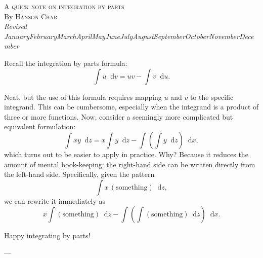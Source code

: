 \documentclass[10pt]{article}
\newcommand{\dd}{\mathop{}\!\mathrm{d}}
\renewcommand{\today}{%
  \number\day\space
  \ifcase\month\or
  January\or February\or March\or April\or May\or June\or July\or August\or September\or October\or November\or December
  \fi
  \space\number\year
}
\begin{document}
\begin{center}
  {\large\textsc{A quick note on integration by parts}}\\[4pt]
  By \textsc{Hanson Char}\\
  {\small\textit{Revised \today}}
\end{center}

Recall the integration by parts formula:
\[
\int u \dd v = uv - \int v \dd u.
\]

Neat, but the use of this formula requires mapping \(u\) and \(v\) to the specific integrand. This can be cumbersome, especially when the integrand is a product of three or more functions. Now, consider a seemingly more complicated but equivalent formulation:
\[
\int xy \dd z = x \int y \dd z - \int \left( \int y \dd z \right) \dd x,
\]
which turns out to be easier to apply in practice. Why? Because it reduces the amount of mental book-keeping: the right-hand side can be written directly from the left-hand side. Specifically, given the pattern
\[
\int x \, (\text{something}) \dd z,
\]
we can rewrite it immediately as
\[
x \int (\text{something}) \dd z - \int \left( \int (\text{something}) \dd z \right) \dd x.
\]

Happy integrating by parts!

\begin{center}
---
\end{center}
\end{document}
